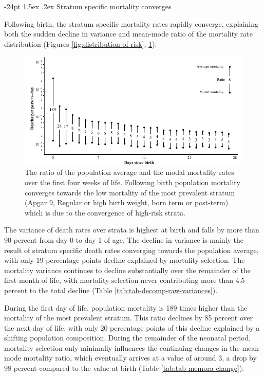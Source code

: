 \documentclass[10pt,twoside,reqno]{article}
\makeatletter
\def\cnstmaxfigwidth{
      \ifdim \Gin@nat@width>\linewidth
        \linewidth
      \else \Gin@nat@width
      \fi
    }
\let\Oldincludegraphics\includegraphics
\renewcommand{\includegraphics}[1]{\Oldincludegraphics[width=\cnstmaxfigwidth]{#1}}
\renewcommand\subsection{\@startsection{subsection}{2}{\z@}%
                                     {-24pt}%
                                     {1.5ex \@plus .2ex}%
                                     {\normalfont\normalsize\bfseries}}
\makeatother
\begin{document}
\subsection{Stratum specific mortality converges}\label{stratum-specific-mortality-converges}

Following birth, the stratum specific mortality rates rapidly converge, explaining both the sudden decline in variance and mean-mode ratio of the mortality rate distribution (Figures \ref{fig:distribution-of-risk}, \ref{fig:mean-mode-convergence}).

\begin{figure}
\centering
\includegraphics{fig/mean_mode_convergence.pdf}
\caption{\label{fig:mean-mode-convergence}The ratio of the population average and the modal mortality rates over the first four weeks of life. Following birth population mortality converges towards the low mortality of the most prevalent stratum (Apgar 9, Regular or high birth weight, born term or post-term) which is due to the convergence of high-risk strata.}
\end{figure}

The variance of death rates over strata is highest at birth and falls by more than 90 percent from day 0 to day 1 of age. The decline in variance is mainly the result of stratum specific death rates converging towards the population average, with only 19 percentage points decline explained by mortality selection. The mortality variance continues to decline substantially over the remainder of the first month of life, with mortality selection never contributing more than 4.5 percent to the total decline (Table \ref{tab:tab-decomp-raw-variances}).

During the first day of life, population mortality is 189 times higher than the mortality of the most prevalent stratum. This ratio declines by 85 percent over the next day of life, with only 20 percentage points of this decline explained by a shifting population composition. During the remainder of the neonatal period, mortality selection only minimally influences the continuing changes in the mean-mode mortality ratio, which eventually arrives at a value of around 3, a drop by 98 percent compared to the value at birth (Table \ref{tab:tab-memora-change}).
\end{document}
